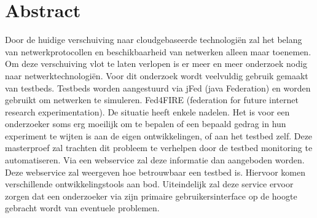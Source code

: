 \newpage
\chapter*{Abstract}
\npar
Door de huidige verschuiving naar cloudgebaseerde technologi\"en zal het belang 
van netwerkprotocollen en beschikbaarheid van netwerken alleen maar toenemen.
Om deze verschuiving vlot te laten verlopen is er meer en meer onderzoek nodig naar netwerktechnologi\"en.
Voor dit onderzoek wordt veelvuldig gebruik gemaakt van testbeds.
Testbeds worden aangestuurd via jFed (java Federation)
 en worden gebruikt om netwerken te simuleren. Fed4FIRE (federation for future internet research experimentation).
De situatie heeft enkele nadelen. Het is voor een onderzoeker soms erg moeilijk om te bepalen of een bepaald gedrag in hun experiment te wijten is aan de eigen ontwikkelingen, of aan het testbed zelf.
\npar
Deze masterproef zal trachten dit probleem te verhelpen door de testbed monitoring te automatiseren. Via een webservice zal deze informatie dan aangeboden worden. Deze webservice zal weergeven hoe betrouwbaar een testbed is. Hiervoor komen verschillende ontwikkelingstools aan bod. Uiteindelijk zal deze service ervoor zorgen dat een onderzoeker via zijn primaire gebruikersinterface op de hoogte gebracht wordt van eventuele problemen.